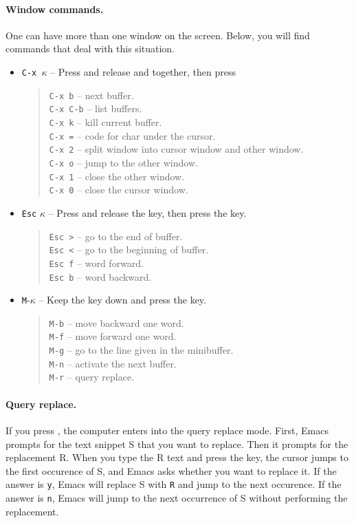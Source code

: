 \documentclass[a4paper,12pt]{book}
\begin{document}
\paragraph{Window commands.} One can have more
than one window on the screen. Below, you will
find commands that deal with this situation.
\begin{itemize}
\item \verb|C-x |$\kappa$ -- Press and release 
and  together, then press \keys{$\kappa$} 
\begin{quote}
\verb|C-x b| -- next buffer.\\
\verb|C-x C-b| -- list buffers.\\
\verb|C-x k| -- kill current buffer.\\
\verb|C-x =| -- code for char under the cursor.\\
\verb|C-x 2| -- split window into cursor window and other window.\\
\verb|C-x o| -- jump to the other window.\\
\verb|C-x 1| -- close the other window.\\
\verb|C-x 0| -- close the cursor window.
\end{quote}
\item \verb|Esc| $\kappa$ -- Press and release the  key,
then press the \keys{$\kappa$} key.
\begin{quote}
\verb|Esc >| -- go to the end of buffer.\\
\verb|Esc <| -- go to the beginning of buffer.\\ 
\verb|Esc f| -- word forward.\\
\verb|Esc b| -- word backward.\\
\end{quote}
\item \verb|M|-$\kappa$ -- Keep the  key
down and press the \keys{$\kappa$} key.
\begin{quote}
\verb|M-b| -- move backward one word.\\
\verb|M-f| -- move forward one word.\\
\verb|M-g| -- go to the line given in the minibuffer.\\
\verb|M-n| -- activate the next buffer.\\
\verb|M-r| -- query replace.
\end{quote}
\end{itemize}

\paragraph{Query replace.} If you press \keys{\%},
the computer enters into the query replace mode.
First, Emacs prompts for the text snippet S
that you want to replace. Then it prompts for
the replacement R. When you type the R text and
press the  key, the cursor jumps to
the first occurence of S, and Emacs asks whether
you want to replace it. If the answer is \verb|y|,
Emacs will replace S with \verb|R| and jump to
the next occurence. If the answer is \verb|n|,
Emacs will jump to the next occurrence of S without
performing the replacement.
\end{document}
